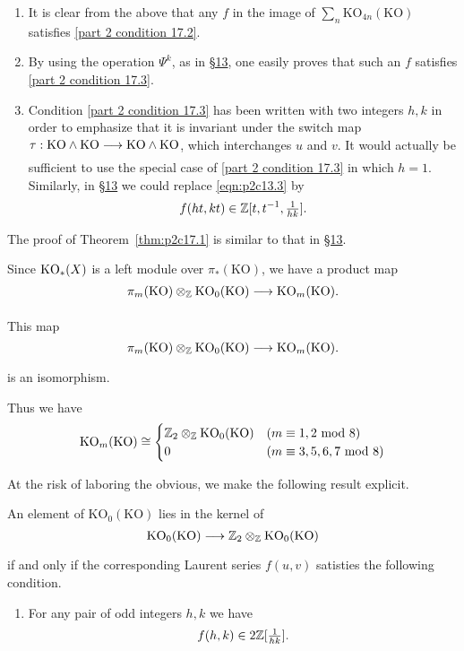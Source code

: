 \documentclass[../main]{subfiles}
\begin{document}
\begin{notes}
    \begin{enumerate}[label=(\thechapter.\arabic*), start=4]
        \item \label{part 2 note 17.4}
        It is clear from the above that any $f$ in the image of $\sum_n \mathrm{KO}_{4n}(\mathrm{KO})$ satisfies \ref{part 2 condition 17.2}.
        \item \label{part 2 note 17.5}
        By using the operation $\Psi^k$, as in \hyperref[sec:p2c13]{\S 13}, one easily proves that such an $f$ satisfies \ref{part 2 condition 17.3}.
        \item \label{part 2 note 17.6}
        Condition \ref{part 2 condition 17.3} has been written with two integers $h,k$ in order to emphasize that it is invariant under the switch map $\tau: \mathrm{KO}\wedge \mathrm{KO} \lar{} \mathrm{KO} \wedge \mathrm{KO}$, which interchanges $u$ and $v$. It would actually be sufficient to use the special case of \ref{part 2 condition 17.3} in which $h=1$. Similarly, in \hyperref[sec:p2c13]{\S 13} we could replace \eqref{eqn:p2c13.3} by
        \[
        f(ht,kt) \in \mathbb{Z}[t,t^{-1}, \tfrac{1}{hk}].
        \]
    \end{enumerate}
\end{notes}

The proof of Theorem~\ref{thm:p2c17.1} is similar to that in \hyperref[sec:p2c13]{\S 13}.

Since $\mathrm{KO}_\ast(X)$ is a left module over $\pi_\ast(\mathrm{KO})$, we have a product map
\[
\pi_m(\mathrm{KO}) \otimes_\bbZ \mathrm{KO}_0(\mathrm{KO})
\lar{}
\mathrm{KO}_m(\mathrm{KO}).
\]

\setcounter{theorem}{6} %
\begin{theorem}
\label{thm:p2c17.7}
This map 
\[
\pi_m(\mathrm{KO}) \otimes_\bbZ \mathrm{KO}_0(\mathrm{KO})
\lar{}
\mathrm{KO}_m(\mathrm{KO}).
\]
is an isomorphism.
\end{theorem}

Thus we have
\[
\mathrm{KO}_m(\mathrm{KO})
\cong
\begin{cases}
\bbZ_2 \otimes_\bbZ \mathrm{KO}_0(\mathrm{KO}) &(m\equiv 1,2 \ \text{mod 8})     \\
0                                              &(m\equiv 3,5,6,7 \ \text{mod 8})
\end{cases}
\]

At the risk of laboring the obvious, we make the following result explicit.
\begin{proposition}
\label{prop:p2c17.8}
An element of $\mathrm{KO}_0(\mathrm{KO})$ lies in the kernel of
\[
\mathrm{KO}_0(\mathrm{KO})
\lar{}
\bbZ_2 \otimes_\bbZ \mathrm{KO}_0(\mathrm{KO})
\]
if and only if the corresponding Laurent series $f(u,v)$ satisties the following condition.
    \begin{enumerate}[label=(\thechapter.\arabic*), start=9]
        \item \label{part 2 condition 17.9}
        For any pair of odd integers $h,k$ we have
        \[
        f(h,k) \in 2\mathbb{Z}[\tfrac{1}{hk}].
        \]
    \end{enumerate}
\end{proposition}
\end{document}
